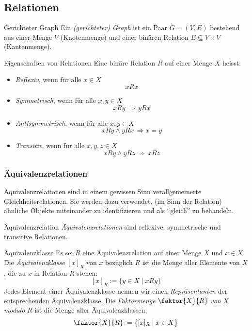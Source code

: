 \subsection{Relationen}

\begin{definition}{Gerichteter Graph}
    Ein \textit{(gerichteter) Graph} ist ein Paar $G=(V,E)$ bestehend aus einer Menge $V$ (Knotenmenge)
    und einer binären Relation $E\subseteq V\times V$ (Kantenmenge).
\end{definition}

\begin{definition}{Eigenschaften von Relationen}
    Eine binäre Relation $R$ auf einer Menge $X$ heisst:
    \begin{itemize}
        \item \textit{Reflexiv}, wenn für alle $x\in X$
            \[
                xRx
            \]

        \item \textit{Symmetrisch}, wenn für alle $x,y\in X$
            \[
                xRy\,\Rightarrow\, yRx
            \]

        \item \textit{Antisymmetrisch}, wenn für alle $x,y\in X$
            \[
                xRy\land yRx\,\Rightarrow x=y
            \]

        \item \textit{Transitiv}, wenn für alle $x,y,z\in X$
            \[
                xRy\land yRz\,\Rightarrow \, xRz
            \]

    \end{itemize}
\end{definition}

\subsubsection{Äquivalenzrelationen}

Äquivalenzrelationen sind in einem gewissen Sinn verallgemeinerte Gleichheitsrelationen. Sie werden dazu verwendet, (im Sinn der Relation) ähnliche Objekte miteinander zu identifizieren und als ``gleich'' zu behandeln.

\begin{definition}{Äquivalenzrelation}
    \textit{Äquivalenzrelationen} sind reflexive, symmetrische und transitive Relationen.
\end{definition}

\begin{definition}{Äquivalenzklasse}
    Es sei $R$ eine Äquivalenzrelation auf einer Menge $X$ und $x\in X$. Die \textit{Äquivalenzklasse} $[x]_R$ von $x$ bezüglich $R$ ist die Menge aller Elemente von $X$, die zu $x$ in Relation $R$ stehen:
    \[
        [x]_R:=\{y\in X\mid xRy \}
    \]
    Jedes Element einer Äquivalenzklasse nennen wir einen \textit{Repräsentanten} der entsprechenden Äquivalenzklasse. Die \textit{Faktormenge} $\faktor{X}{R}$ \textit{von} $X$ \textit{modulo} $R$ ist die Menge aller Äquivalenzklassen:
    \[
        \faktor{X}{R}:=\big\{ [x]_R\mid x\in X \big\}
    \]
\end{definition}

